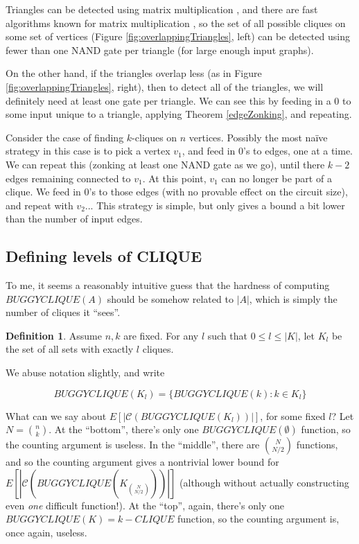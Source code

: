 \documentclass[12pt]{article}
\theoremstyle{definition}
\newtheorem{defn}{Definition}[section]
\newcommand{\bigC}[0]{\mathcal{C}}
\begin{document}
Triangles can be detected using matrix multiplication \cite{itai_finding_1977},
and there are fast algorithms known for matrix multiplication
\cite{strassen_gaussian_1969}
\cite{williams_multiplying_2012}, so the set of all possible
cliques on some set of vertices (Figure \ref{fig:overlappingTriangles}, left)
 can be detected
using fewer than one NAND gate per triangle (for large enough input graphs).

On the other hand, if the triangles overlap less (as in
Figure \ref{fig:overlappingTriangles}, right),
then to detect all of the triangles, we will definitely need at least one
gate per triangle. We can see this by feeding in a 0 to some input
unique to a triangle, applying Theorem \ref{edgeZonking}, and repeating.

Consider the case of finding $k$-cliques on $n$ vertices.
Possibly the most na\"ive strategy in this case is to pick a vertex $v_1$,
and feed in 0's to edges, one at a time. We can repeat this
(zonking at least one NAND gate as we go), until there
$k-2$ edges remaining connected to $v_1$. At this point, $v_1$ can no
longer be part of a clique. We feed in 0's to those edges (with no
provable effect on the circuit size), and repeat with $v_2$...
This strategy is simple, but only gives a bound a bit lower than
the number of input edges.

\subsection{Defining levels of CLIQUE}

To me, it seems a reasonably intuitive guess that the hardness of
computing $BUGGYCLIQUE(A)$ should be somehow related to
$|A|$, which is simply the number of cliques it ``sees''.

\begin{defn}
\label{CLIQUE-level}
Assume $n, k$ are fixed. For any $l$ such that
$0 \le l \le |K|$, let $K_l$ be the set of all sets
with exactly $l$ cliques. 
\end{defn}

We abuse notation slightly, and write

\[
BUGGYCLIQUE(K_l) = \{ BUGGYCLIQUE(k) : k \in K_l \}
\]

What can we say about $E[|\bigC(BUGGYCLIQUE(K_l))|]$, for
some fixed $l$? Let $N = {n \choose k}$.
At the ``bottom'', there's only one $BUGGYCLIQUE(\emptyset)$
function, so the counting argument is useless.
In the ``middle'',
there are ${N \choose {N/2}}$ functions, and so the counting
argument gives a nontrivial lower bound for
$E[|\bigC(BUGGYCLIQUE(K_{N \choose {N/2}}))|]$ (although
without actually constructing even {\em one} difficult function!).
At the ``top'', again, there's only one $BUGGYCLIQUE(K) = k-CLIQUE$
function, so the counting argument is, once again, useless.
\end{document}
